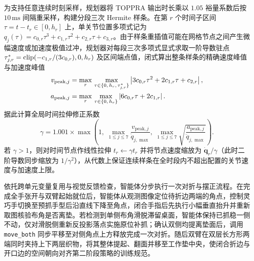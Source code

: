 为支持任意连续时刻采样，规划器将 TOPPRA 输出时长乘以 $1.05$ 裕量系数后按 $10\,\mathrm{ms}$ 间隔重采样，构建分段三次 Hermite 样条。在第 $r$ 个时间子区间 $\tau = t - t_r \in [0, h_r]$ 上，单关节位置多项式记为 $q_j(\tau) = c_{0,r}\tau^3 + c_{1,r}\tau^2 + c_{2,r}\tau + c_{3,r}$。由于样条重插值可能在网格节点之间产生微幅速度或加速度极值过冲，规划器对每段三次多项式显式求取一阶导数驻点 $\tau_{j,r}^* = \operatorname{clip}(-c_{1,r}/(3c_{0,r}), 0, h_r)$ 及区间端点值，闭式算出整条样条的精确速度峰值与加速度峰值
\begin{align}
  v_{\text{peak},j} &= \max_{r}\,\max_{\tau \in \{0,\, h_r,\, \tau_{j,r}^*\}} \left|3c_{0,r}\tau^2 + 2c_{1,r}\tau + c_{2,r}\right|, \notag\\
  a_{\text{peak},j} &= \max_{r}\,\max_{\tau \in \{0,\, h_r\}} \left|6c_{0,r}\tau + 2c_{1,r}\right|.
  \label{eq:hermite-extrema}
\end{align}
据此计算全局时间拉伸修正系数
\begin{equation}
  \gamma = 1.001 \times \max\!\left(1, \; \max_{1 \le j \le 7} \frac{v_{\text{peak},j}}{\dot{q}_{j,\max}}, \; \max_{1 \le j \le 7} \sqrt{\frac{a_{\text{peak},j}}{\ddot{q}_{j,\max}}}\right).
  \label{eq:time-stretch}
\end{equation}
若 $\gamma > 1$，则对时间节点作线性拉伸 $t_r \leftarrow \gamma t_r$ 并将节点速度缩放为 $\dot{\bm{q}}_r / \gamma$（此时二阶导数同步缩放为 $1/\gamma^2$），从代数上保证连续样条在全时段内不超出配置的关节速度与加速度上限。

依托跨单元变量复用与视觉反馈检查，智能体分步执行一次对折与摆正流程。在完成全手张开与双臂起始就位后，智能体从观测图像定位待折边两端的角点，控制灵巧手切换至预抓手型后沿直线下降至角点，闭合手指后先执行小幅垂直抬升并重新取图核验布角是否离垫。若检测到单侧布角滑脱滞留桌面，智能体保持已抓稳一侧不动，仅对滑脱侧重新反投影落点实施原位补抓；确认双侧均提离垫面后，调用 \texttt{move\_both} 同步平移至对侧角点上方释放完成一次对折。随后双臂在双层长方形两端同时夹持上下两层织物，将其整体提起、翻面并移至工作垫中央，使闭合折边与开口边的空间朝向对齐第二阶段策略的训练规范。
